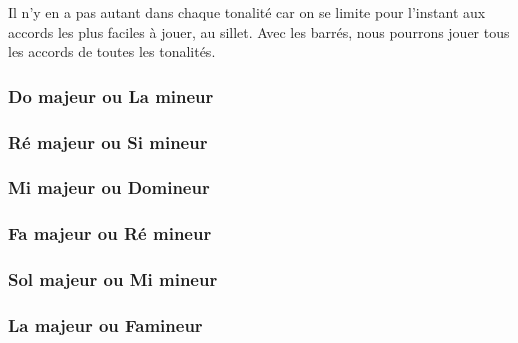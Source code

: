 \documentclass[11pt]{article}
\begin{document}
Il n’y en a pas autant dans chaque tonalité car on se limite pour l’instant aux
accords les plus faciles à jouer, au sillet. Avec les barrés, nous pourrons
jouer tous les accords de toutes les tonalités.

\subsubsection{Do majeur ou La mineur}


\subsubsection{Ré majeur ou Si mineur}


\subsubsection{Mi majeur ou Do\shrp mineur}


\subsubsection{Fa majeur ou Ré mineur}


\subsubsection{Sol majeur ou Mi mineur}


\subsubsection{La majeur ou Fa\shrp mineur}
\end{document}
